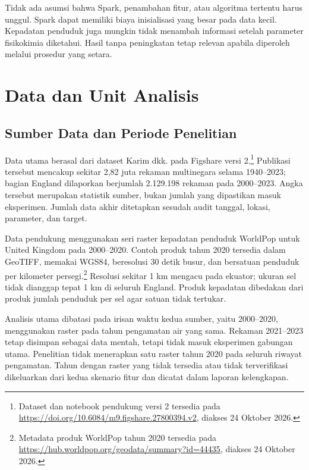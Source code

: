 Tidak ada asumsi bahwa Spark, penambahan fitur, atau algoritma tertentu harus unggul. Spark dapat memiliki biaya inisialisasi yang besar pada data kecil. Kepadatan penduduk juga mungkin tidak menambah informasi setelah parameter fisikokimia diketahui. Hasil tanpa peningkatan tetap relevan apabila diperoleh melalui prosedur yang setara.

\section{Data dan Unit Analisis}

\subsection{Sumber Data dan Periode Penelitian}

Data utama berasal dari dataset Karim dkk. \cite{karim_comprehensive_2025} pada Figshare versi 2.\footnote{\label{fn:bab3-dataset}Dataset dan notebook pendukung versi 2 tersedia pada \url{https://doi.org/10.6084/m9.figshare.27800394.v2}, diakses 24 Oktober 2026.} Publikasi tersebut mencakup sekitar 2,82 juta rekaman multinegara selama 1940--2023; bagian England dilaporkan berjumlah 2.129.198 rekaman pada 2000--2023. Angka tersebut merupakan statistik sumber, bukan jumlah yang dipastikan masuk eksperimen. Jumlah data akhir ditetapkan sesudah audit tanggal, lokasi, parameter, dan target.

Data pendukung menggunakan seri raster kepadatan penduduk WorldPop untuk United Kingdom pada 2000--2020. Contoh produk tahun 2020 tersedia dalam GeoTIFF, memakai WGS84, beresolusi 30 detik busur, dan bersatuan penduduk per kilometer persegi.\footnote{Metadata produk WorldPop tahun 2020 tersedia pada \url{https://hub.worldpop.org/geodata/summary?id=44435}, diakses 24 Oktober 2026.} Resolusi sekitar 1 km mengacu pada ekuator; ukuran sel tidak dianggap tepat 1 km di seluruh England. Produk kepadatan dibedakan dari produk jumlah penduduk per sel agar satuan tidak tertukar.

Analisis utama dibatasi pada irisan waktu kedua sumber, yaitu 2000--2020, menggunakan raster pada tahun pengamatan air yang sama. Rekaman 2021--2023 tetap disimpan sebagai data mentah, tetapi tidak masuk eksperimen gabungan utama. Penelitian tidak menerapkan satu raster tahun 2020 pada seluruh riwayat pengamatan. Tahun dengan raster yang tidak tersedia atau tidak terverifikasi dikeluarkan dari kedua skenario fitur dan dicatat dalam laporan kelengkapan.

